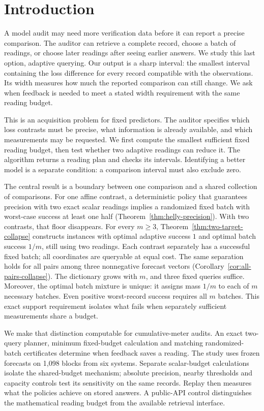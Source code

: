 \section{Introduction}
A model audit may need more verification data before it can report a precise
comparison. The auditor can retrieve a complete record, choose a batch of
readings, or choose later readings after seeing earlier answers. We study
this last option, adaptive querying. Our output is a sharp interval: the
smallest interval containing the loss difference for every record compatible
with the observations. Its width measures how much the reported comparison
can still change. We ask when feedback is needed to meet a stated width
requirement with the same reading budget.

This is an acquisition problem for fixed predictors. The auditor specifies
which loss contrasts must be precise, what information is already available,
and which measurements may be requested. We first compute the smallest
sufficient fixed reading budget, then test whether two adaptive readings
can reduce it. The algorithm returns a reading plan and checks its intervals.
Identifying a better model is a separate
condition: a comparison interval must also exclude zero.

The central result is a boundary between one comparison and a shared
collection of comparisons. For one affine contrast, a deterministic policy
that guarantees precision with two exact scalar readings implies a
randomized fixed batch with worst-case success at least one half
(Theorem~\ref{thm:helly-precision}). With two contrasts, that floor disappears.
For every $m\geq3$, Theorem~\ref{thm:two-target-collapse} constructs instances
with optimal adaptive success $1$ and optimal batch success $1/m$, still
using two readings. Each contrast separately has a successful fixed batch;
all coordinates are queryable at equal cost. The same separation holds for
all pairs among three nonnegative forecast vectors
(Corollary~\ref{cor:all-pairs-collapse}). The dictionary grows with $m$,
and three fixed queries suffice. Moreover, the optimal batch mixture is
unique: it assigns mass $1/m$ to each of $m$ necessary batches. Even positive
worst-record success requires all $m$ batches. This exact support requirement
isolates what fails when separately sufficient measurements share a budget.

We make that distinction computable for cumulative-meter audits. An exact
two-query planner, minimum fixed-budget calculation and matching randomized-batch
certificates determine when feedback saves a reading. The study uses frozen
forecasts on 1,098 blocks from six systems. Separate scalar-budget calculations
isolate the shared-budget mechanism; absolute precision, nearby thresholds
and capacity controls test its sensitivity on the same records. Replay then
measures what the policies achieve on stored answers. A public-API control
distinguishes the mathematical reading budget from the available retrieval
interface.


